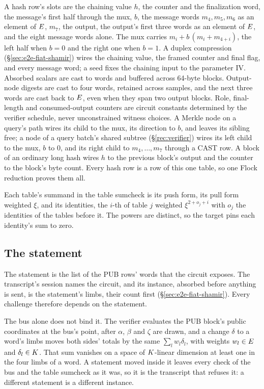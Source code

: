 A hash row's slots are the chaining value $h$, the counter and the finalization word, the message's first half through the mux, $b$, the message words $m_4,m_5,m_6$ as an element of $E$, $m_7$, the output, the output's first three words as an element of $E$, and the eight message words alone. The mux carries $m_i+b\,(m_i+m_{4+i})$, the left half when $b=0$ and the right one when $b=1$. A duplex compression (\S\ref{sec:e2e-fiat-shamir}) wires the chaining value, the framed counter and final flag, and every message word; a seed fixes the chaining input to the parameter IV. Absorbed scalars are cast to words and buffered across 64-byte blocks. Output-node digests are cast to four words, retained across samples, and the next three words are cast back to $E$, even when they span two output blocks. Role, final-length and consumed-output counters are circuit constants determined by the verifier schedule, never unconstrained witness choices. A Merkle node on a query's path wires its child to the mux, its direction to $b$, and leaves its sibling free; a node of a query batch's shared subtree (\S\ref{rec:verifier}) wires its left child to the mux, $b$ to $0$, and its right child to $m_4,\dots,m_7$ through a \textsf{CAST} row. A block of an ordinary long hash wires $h$ to the previous block's output and the counter to the block's byte count. Every hash row is a row of this one table, so one Flock reduction proves them all.

Each table's summand in the table sumcheck is its push form, its pull form weighted $\xi$, and its identities, the $i$-th of table $j$ weighted $\xi^{2+o_j+i}$ with $o_j$ the identities of the tables before it. The powers are distinct, so the target pins each identity's sum to zero.

\subsection{The statement}\label{rec:statement}

The statement is the list of the \textsf{PUB} rows' words that the circuit exposes. The transcript's session names the circuit, and its instance, absorbed before anything is sent, is the statement's limbs, their count first (\S\ref{sec:e2e-fiat-shamir}). Every challenge therefore depends on the statement.

The bus alone does not bind it. The verifier evaluates the \textsf{PUB} block's public coordinates at the bus's point, after $\alpha$, $\beta$ and $\zeta$ are drawn, and a change $\delta$ to a word's limbs moves both sides' totals by the same $\sum_l w_l\delta_l$, with weights $w_l\in E$ and $\delta_l\in K$. That sum vanishes on a space of $K$-linear dimension at least one in the four limbs of a word. A statement moved inside it leaves every check of the bus and the table sumcheck as it was, so it is the transcript that refuses it: a different statement is a different instance.

